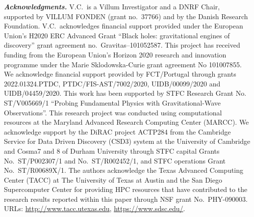\documentclass[floats,floatfix,showpacs,amssymb,prd,twocolumn,superscriptaddress,nofootinbib,nolongbibliography,reprint]{revtex4-2}
\begin{document}
\noindent
{\bf \em Acknowledgments.} 
V.C.\ is a Villum Investigator and a DNRF Chair, supported by VILLUM FONDEN (grant no.~37766) and by the Danish Research Foundation. V.C.\ acknowledges financial support provided under the European
Union's H2020 ERC Advanced Grant ``Black holes: gravitational engines of discovery'' grant agreement
no.\ Gravitas–101052587.
%
This project has received funding from the European Union's Horizon 2020 research and innovation programme under the Marie Sklodowska-Curie grant agreement No 101007855.
We acknowledge financial support provided by FCT/Portugal through grants 
2022.01324.PTDC, PTDC/FIS-AST/7002/2020, UIDB/00099/2020 and UIDB/04459/2020.
This work has been supported by
STFC Research Grant No. ST/V005669/1
``Probing Fundamental Physics with Gravitational-Wave Observations''.
This research project was conducted using computational resources at the Maryland Advanced Research Computing Center (MARCC).
We acknowledge support by the DiRAC project
ACTP284 from the Cambridge Service for Data Driven Discovery (CSD3)
system at the University of Cambridge
and Cosma7 and 8 of Durham University through STFC capital Grants
No.~ST/P002307/1 and No.~ST/R002452/1, and STFC operations Grant
No.~ST/R00689X/1.
The authors acknowledge the Texas Advanced Computing Center (TACC) at The
University of Texas at Austin
and the San Diego Supercomputer Center for providing HPC resources that have contributed
to the research results reported within this paper through
NSF grant No.~PHY-090003. URLs: \url{http://www.tacc.utexas.edu}, \url{https://www.sdsc.edu/}.



\end{document}
